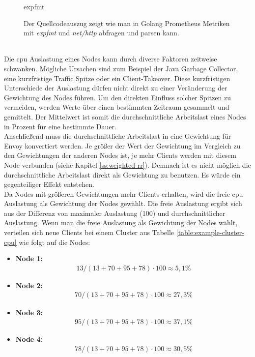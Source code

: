 \begin{figure}
    {expfmt}
    \caption{Der Quellcodeauszug zeigt wie man in Golang Prometheus Metriken mit \textit{expfmt} und \textit{net/http} abfragen und parsen kann.}
    \label{code:expfmt}
\end{figure}
\\
Die \ac{cpu} Auslastung eines Nodes kann durch diverse Faktoren zeitweise schwanken. Mögliche Ursachen sind zum Beispiel der Java Garbage Collector, eine kurzfristige Traffic Spitze oder ein Client-Takeover.
Diese kurzfristigen Unterschiede der Auslastung dürfen nicht direkt zu einer Veränderung der Gewichtung des Nodes führen.
Um den direkten Einfluss solcher Spitzen zu vermeiden, werden Werte über einen bestimmten Zeitraum gesammelt und gemittelt. Der Mittelwert ist somit die durchschnittliche Arbeitslast eines Nodes in Prozent für eine bestimmte Dauer.
\\
Anschlie{\ss}end muss die durchschnittliche Arbeitslast in eine Gewichtung für Envoy konvertiert werden. Je grö{\ss}er der Wert der Gewichtung im Vergleich zu den Gewichtungen der anderen Nodes ist, je mehr Clients werden mit diesem Node verbunden (siehe Kapitel \ref{ss:weighted-rr}). Demnach ist es nicht möglich die durchschnittliche Arbeitslast direkt als Gewichtung zu benutzen. Es würde ein gegenteiliger Effekt entstehen.
\\
Da Nodes mit grö{\ss}eren Gewichtungen mehr Clients erhalten, wird die freie \ac{cpu} Auslastung als Gewichtung der Nodes gewählt.
Die freie Auslastung ergibt sich aus der Differenz von maximaler Auslastung (100) und durchschnittlicher Auslastung.
Wenn man die freie Auslastung als Gewichtung der Nodes wählt, verteilen sich neue Clients bei einem Cluster aus Tabelle \ref{table:example-cluster-cpu} wie folgt auf die Nodes:
\begin{itemize}
  \item \textbf{Node 1:}
    \begin{align}
      13 / (13 + 70 + 95 + 78) \cdot 100 \approx 5,1 \%
    \end{align}
  \item \textbf{Node 2:}
    \begin{align}
      70 / (13 + 70 + 95 + 78) \cdot 100 \approx 27,3 \%
    \end{align}
  \item \textbf{Node 3:}
    \begin{align}
      95 / (13 + 70 + 95 + 78) \cdot 100 \approx 37,1 \%
    \end{align}
  \item \textbf{Node 4:}
    \begin{align}
      78 / (13 + 70 + 95 + 78) \cdot 100 \approx 30,5 \%
    \end{align}
\end{itemize}
